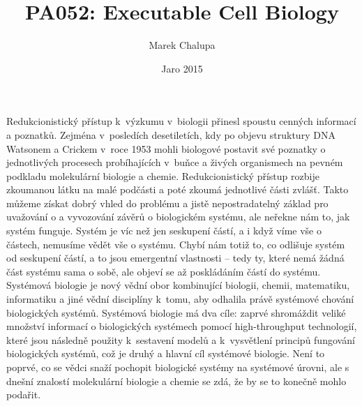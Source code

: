 \documentclass[a4paper]{article}
\title {PA052: Executable Cell Biology}
\author {Marek Chalupa}
\date {Jaro 2015}
\begin{document}
\maketitle

\par
Redukcionistický přístup k~výzkumu v~biologii přinesl spoustu cenných informací a poznatků.
Zejména v~posledích desetiletích, kdy po objevu struktury DNA Watsonem a Crickem v~roce 1953\cite{WatCri1953}
mohli biologové postavit své poznatky o jednotlivých procesech probíhajících v~buňce a živých
organismech na pevném podkladu molekulární biologie a chemie\cite{Kitano}.
Redukcionistický přístup rozbije zkoumanou látku na malé podčásti a poté zkoumá jednotlivé části zvlášť.
Takto můžeme získat dobrý vhled do problému a jistě nepostradatelný základ pro uvažování
o a vyvozování závěrů o biologickém systému, ale neřekne nám to, jak systém funguje.
Systém je víc než jen seskupení částí, a i když víme vše o částech, nemusíme vědět
vše o systému. Chybí nám totiž to, co odlišuje systém od seskupení částí, a to jsou
emergentní vlastnosti -- tedy ty, které nemá žádná část systému sama o sobě, ale
objeví se až poskládáním částí do systému.
Systémová biologie je nový vědní obor kombinující biologii, chemii, matematiku,
informatiku a jiné vědní disciplíny k~tomu, aby odhalila právě systémové
chování biologických systémů. Systémová biologie má dva cíle\cite{Cardelli}: zaprvé
shromáždit veliké množství informací o biologických systémech pomocí high-throughput
technologií, které jsou následně použity k~sestavení modelů a k~vysvětlení principů
fungování biologických systémů, což je druhý a hlavní cíl systémové biologie.
Není to poprvé, co se vědci snaží pochopit biologické systémy na systémové úrovni,
ale s dnešní znalostí molekulární biologie a chemie se zdá, že by se to konečně
mohlo podařit\cite{Kitano}.
\end{document}
